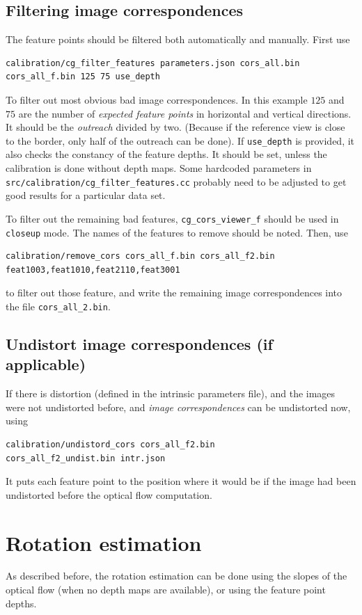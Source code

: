 \documentclass{scrreprt}
\begin{document}
\subsection{Filtering image correspondences}
The feature points should be filtered both automatically and manually.
First use
\begin{lstlisting}[language=bash]
calibration/cg_filter_features parameters.json cors_all.bin
cors_all_f.bin 125 75 use_depth
\end{lstlisting}
To filter out most obvious bad image correspondences. In this example $125$ and $75$ are the number of \emph{expected feature points} in horizontal and vertical directions. It should be the \emph{outreach} divided by two. (Because if the reference view is close to the border, only half of the outreach can be done). If \texttt{use\_depth} is provided, it also checks the constancy of the feature depths. It should be set, unless the calibration is done without depth maps. Some hardcoded parameters in \texttt{src/calibration/cg\_filter\_features.cc} probably need to be adjusted to get good results for a particular data set.

To filter out the remaining bad features, \texttt{cg\_cors\_viewer\_f} should be used in \texttt{closeup} mode. The names of the features to remove should be noted. Then, use
\begin{lstlisting}[language=bash]
calibration/remove_cors cors_all_f.bin cors_all_f2.bin 
feat1003,feat1010,feat2110,feat3001
\end{lstlisting}
to filter out those feature, and write the remaining image correspondences into the file \texttt{cors\_all\_2.bin}.


\subsection{Undistort image correspondences (if applicable)}
If there is distortion (defined in the intrinsic parameters file), and the images were not undistorted before, and \emph{image correspondences} can be undistorted now, using
\begin{lstlisting}[language=bash]
calibration/undistord_cors cors_all_f2.bin
cors_all_f2_undist.bin intr.json
\end{lstlisting}
It puts each feature point to the position where it would be if the image had been undistorted before the optical flow computation.




\section{Rotation estimation}
As described before, the rotation estimation can be done using the slopes of the optical flow (when no depth maps are available), or using the feature point depths.
\end{document}
